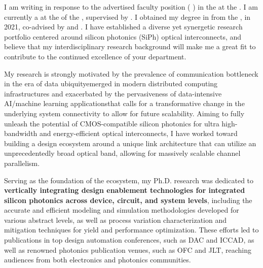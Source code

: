 I am writing in response to the advertised faculty position (\textbf{\appPosition{} \appJobID}) in the \appDept{} at the \appSchool{}. I am currently a \myTitle{} at the \myDept{} of the \mySchoolShort{}, supervised by \mySuper{}. I obtained my \myDegree{} degree in \myMajor{} from the \myPhDSchool{}, in 2021, co-advised by \myAdvisor{} and \myCoAdvisor{}. I have established a diverse yet synergetic research portfolio centered around silicon photonics (SiPh) optical interconnects, and believe that my interdisciplinary research background will make me a great fit to contribute to the continued excellence of your department.

My research is strongly motivated by the prevalence of communication bottleneck in the era of data ubiquity\textemdash emerged in modern distributed computing infrastructures and exacerbated by the pervasiveness of data-intensive AI/machine learning applications\textemdash that calls for a transformative change in the underlying system connectivity to allow for future scalability. Aiming to fully unleash the potential of CMOS-compatible silicon photonics for ultra high-bandwidth and energy-efficient optical interconnects, I have worked toward building a design ecosystem around a unique link architecture that can utilize an unprecedentedly broad optical band, allowing for massively scalable channel parallelism.

Serving as the foundation of the ecosystem, my Ph.D. research was dedicated to \textbf{vertically integrating design enablement technologies for integrated silicon photonics across device, circuit, and system levels}, including the accurate and efficient modeling and simulation methodologies developed for various abstract levels, as well as process variation characterization and mitigation techniques for yield and performance optimization. These efforts led to publications in top design automation conferences, such as DAC and ICCAD, as well as renowned photonics publication venues, such as OFC and JLT, reaching audiences from both electronics and photonics communities.


